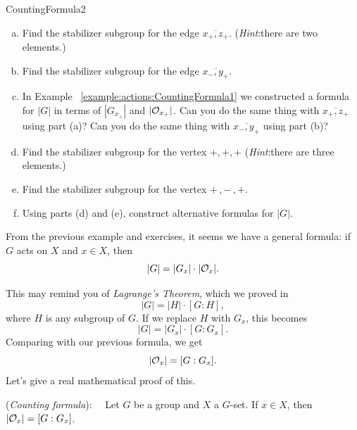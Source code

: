 \begin {exercise}{CountingFormula2}
\begin {enumerate}[(a)]
\item Find the stabilizer subgroup for the edge $\overline{x_+,z_+}$. 
 (\emph{Hint}:there are two elements.) 
\item Find the stabilizer subgroup for the edge $\overline{x_-,y_+}$.
\item In Example ~\ref {example:actions:CountingFormula1} we constructed a formula for $|G|$ in terms of $| G_{x_+}|$ and $|{\cal O}_{x_+}|$.  Can you do the same thing with $\overline{x_+,z_+}$ using part (a)?  Can you do the same thing with $\overline{x_-,y_+}$ using part (b)?  
\item Find the stabilizer subgroup for the vertex $+,+,+$ 
(\emph{Hint}:there are three elements.)
\item Find the stabilizer subgroup for the vertex $+\,,-\,,+$. 
\item Using parts (d) and (e), construct alternative formulas for $|G|$.
\end{enumerate}
\end{exercise}

From the previous example and exercises, it seems we have a general formula:  if $G$ acts on $X$ and $x\in X$, then 
$$|G|=|G_x|\cdot|{\cal O}_x|.$$

This may remind you of \emph{Lagrange's Theorem}, which we proved in %
$$|G|=|H|\cdot [G:H], $$
where $H$ is any subgroup of $G$.  If we replace $H$ with $G_x$, this becomes $$|G|=|G_x|\cdot [G:G_x]. $$
Comparing with our previous formula, we get
 $$|{\cal O}_x|=[G:G_x].$$
Let's give a real mathematical proof of this.

\begin{thm}\label{prop:CountingFormula}(\emph{Counting formula}):~~
Let $G$ be a group and $X$ a $G$-set. If $x\in X$,
then $|{\cal O}_x| = [G:G_x]$. 
\end{thm}

